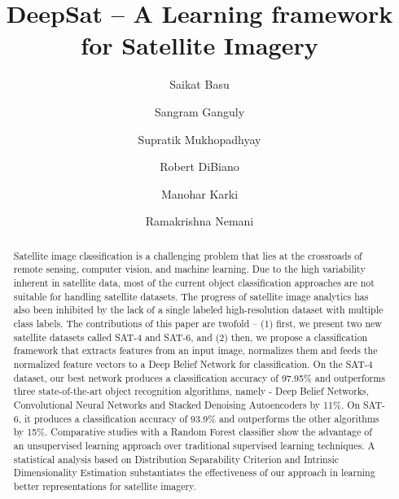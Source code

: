 \documentclass[11pt,a4paper]{article}
\begin{document}
\title{DeepSat -- A Learning framework for Satellite Imagery}





\author[1]{Saikat Basu}
\author[2]{Sangram Ganguly}
\author[1]{Supratik Mukhopadhyay}
\author[1]{Robert DiBiano}
\author[1]{Manohar Karki}
\author[3]{Ramakrishna Nemani}

\renewcommand\Authands{ and }





\maketitle
\begin{abstract}
Satellite image classification is a challenging problem that lies at the crossroads of remote sensing, computer vision, and machine learning. Due to the high variability inherent in satellite data, most of the current object classification approaches are not suitable for handling satellite datasets. The progress of satellite image analytics has also been inhibited by the lack of a single labeled high-resolution dataset with multiple class labels. The contributions of this paper are twofold -- (1) first, we present two new satellite datasets called SAT-4 and SAT-6, and (2) then, we propose a classification framework that extracts features from an input image, normalizes them and feeds the normalized feature vectors to a Deep Belief Network for classification. On the SAT-4 dataset, our best network produces a classification accuracy of 97.95\% and outperforms three state-of-the-art object recognition algorithms, namely - Deep Belief Networks, Convolutional Neural Networks and Stacked Denoising Autoencoders by 11\%. On SAT-6, it produces a classification accuracy of 93.9\% and outperforms the other algorithms by 15\%. Comparative studies with a Random Forest classifier show the advantage of an unsupervised learning approach over traditional supervised learning techniques. A statistical analysis based on Distribution Separability Criterion and Intrinsic Dimensionality Estimation substantiates the effectiveness of our approach in learning better representations for satellite imagery. 
\end{abstract}
\end{document}

